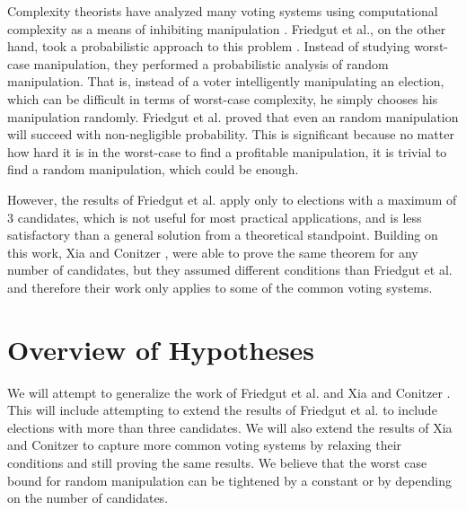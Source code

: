 Complexity theorists have analyzed many voting systems using computational complexity as a means of inhibiting manipulation \cite{bartholdi1989computational, hemaspaandra2009hybrid}. Friedgut et al., on the other hand, took a probabilistic approach to this problem \cite{friedgut2008elections}. Instead of studying worst-case manipulation, they performed a probabilistic analysis of random manipulation. That is, instead of a voter intelligently manipulating an election, which can be difficult in terms of worst-case complexity, he simply chooses his manipulation randomly. Friedgut et al. \cite{friedgut2008elections} proved that even an random manipulation will succeed with non-negligible probability. This is significant because no matter how hard it is in the worst-case to find a profitable manipulation, it is trivial to find a random manipulation, which could be enough.

However, the results of Friedgut et al. \cite{friedgut2008elections} apply only to elections with a maximum of 3 candidates, which is not useful for most practical applications, and is less satisfactory than a general solution from a theoretical standpoint. Building on this work, Xia and Conitzer \cite{xia2008sufficient}, were able to prove the same theorem for any number of candidates, but they assumed different conditions than Friedgut et al. and therefore their work only applies to some of the common voting systems.

\section{Overview of Hypotheses}

We will attempt to generalize the work of Friedgut et al. \cite{friedgut2008elections} and Xia and Conitzer \cite{xia2008sufficient}. This will include attempting to extend the results of Friedgut et al. \cite{friedgut2008elections} to include elections with more than three candidates. We will also extend the results of Xia and Conitzer \cite{xia2008sufficient} to capture more common voting systems by relaxing their conditions and still proving the same results. We believe that the worst case bound for random manipulation can be tightened by a constant or by depending on the number of candidates.
